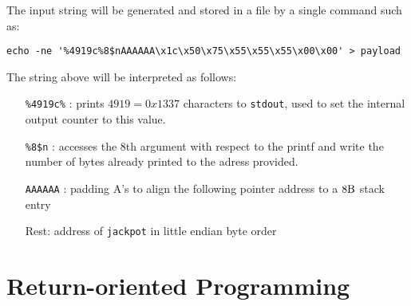 \documentclass[12pt]{article}
\begin{document}
The input string will be generated and stored in a file by a single command such as:
\begin{lstlisting}
echo -ne '%4919c%8$nAAAAAA\x1c\x50\x75\x55\x55\x55\x00\x00' > payload
\end{lstlisting}
The string above will be interpreted as follows:
\begin{itemize}
	\item[\texttt{\%4919c\%} :] prints $4919 = 0x1337$ characters to \texttt{stdout}, used to set the internal output counter to this value.
	\item[\texttt{\%8\$n} :] accesses the 8th argument with respect to the printf and write the number of bytes already printed to the adress provided.
	\item[\texttt{AAAAAA} :] padding A's to align the following pointer address to a $8\si{\byte}$ stack entry
	\item[Rest:] address of \texttt{jackpot} in little endian byte order
\end{itemize}





\newpage
\section{Return-oriented Programming}
\end{document}
